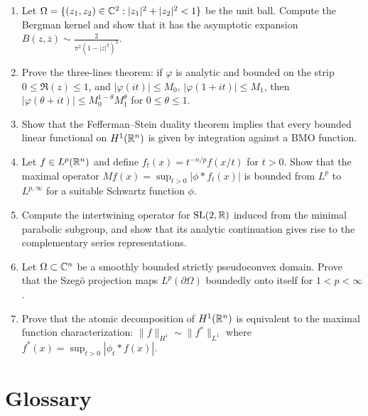 \begin{enumerate}
    \item [I] Let \(\Omega = \{(z_1,z_2) \in \mathbb{C}^2 : |z_1|^2 + |z_2|^2 < 1\}\) be the unit ball. Compute the Bergman kernel and show that it has the asymptotic expansion \(B(z,\overline{z}) \sim \frac{2}{\pi^2 (1 - |z|^2)^3}\).
    \item [B] Prove the three-lines theorem: if \(\varphi\) is analytic and bounded on the strip \(0 \leq \Re(z) \leq 1\), and \(|\varphi(it)| \leq M_0\), \(|\varphi(1+it)| \leq M_1\), then \(|\varphi(\theta + it)| \leq M_0^{1-\theta} M_1^\theta\) for \(0 \leq \theta \leq 1\).
    \item [I] Show that the Fefferman--Stein duality theorem implies that every bounded linear functional on \(H^1(\mathbb{R}^n)\) is given by integration against a BMO function.
    \item [I] Let \(f \in L^p(\mathbb{R}^n)\) and define \(f_t(x) = t^{-n/p} f(x/t)\) for \(t > 0\). Show that the maximal operator \(Mf(x) = \sup_{t>0} |\phi * f_t(x)|\) is bounded from \(L^p\) to \(L^{p,\infty}\) for a suitable Schwartz function \(\phi\).
    \item [A] Compute the intertwining operator for \(\operatorname{SL}(2,\mathbb{R})\) induced from the minimal parabolic subgroup, and show that its analytic continuation gives rise to the complementary series representations.
    \item [A] Let \(\Omega \subset \mathbb{C}^n\) be a smoothly bounded strictly pseudoconvex domain. Prove that the Szeg\"o projection maps \(L^p(\partial\Omega)\) boundedly onto itself for \(1 < p < \infty\).
    \item [I] Prove that the atomic decomposition of \(H^1(\mathbb{R}^n)\) is equivalent to the maximal function characterization: \(\|f\|_{H^1} \sim \|f^*\|_{L^1}\) where \(f^*(x) = \sup_{t>0} |\phi_t * f(x)|\).
\end{enumerate}

\section*{Glossary}


